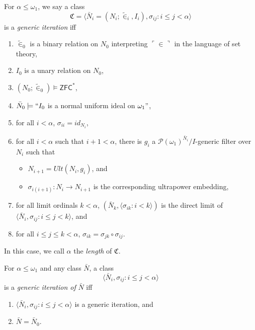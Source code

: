 \documentclass[12pt]{article}
\numberwithin{equation}{section}
\begin{document}
\begin{defi}\label{def257}
For $\alpha \leq \omega_1$, we say a class $$\mathfrak{C} = \langle \bar{N}_i = (N_i; \tilde{\in}_i, I_i), \sigma_{ij} : i \leq j < \alpha \rangle$$ is a \emph{generic iteration} iff 
\begin{enumerate}[label=(\alph*)]
    \item $\tilde{\in}_0$ is a binary relation on $N_0$ interpreting $\ulcorner \in \urcorner$ in the language of set theory,
    \item $I_0$ is a unary relation on $N_0$,
    \item $(N_0; \tilde{\in}_0) \models \mathsf{ZFC}^*$,
    \item $\bar{N}_0 \models ``I_0$ is a normal uniform ideal on $\omega_1"$, 
    \item for all $i < \alpha$, $\sigma_{ii} = id_{N_i}$,
    \item for all $i < \alpha$ such that $i + 1 < \alpha$, there is $g_{i}$ a $\mathcal{P}(\omega_1)^{\bar{N}_{i}} / I$-generic filter over $N_{i}$ such that 
    \begin{itemize}[label=$\circ$]
        \item $N_{i + 1} = Ult(N_{i}, g_{i})$, and
        \item $\sigma_{i(i + 1)} : N_{i} \longrightarrow N_{i + 1}$ is the corresponding ultrapower embedding,
    \end{itemize}
    \item for all limit ordinals $k < \alpha$, $(\bar{N}_{k}, \langle \sigma_{ik} : i < k \rangle)$ is the direct limit of $\langle \bar{N}_i, \sigma_{ij} : i \leq j < k \rangle$, and
    \item for all $i \leq j \leq k < \alpha$, $\sigma_{ik} = \sigma_{jk} \circ \sigma_{ij}$.
\end{enumerate}
In this case, we call $\alpha$ the \emph{length} of $\mathfrak{C}$.
\end{defi}

\begin{defi}
For $\alpha \leq \omega_1$ and any class $\bar{N}$, a class $$\langle \bar{N}_i, \sigma_{ij} : i \leq j < \alpha \rangle$$ is a \emph{generic iteration of} $\bar{N}$ iff 
\begin{enumerate}[label=(\alph*)]
    \item $\langle \bar{N}_i, \sigma_{ij} : i \leq j < \alpha \rangle$ is a generic iteration, and
    \item $\bar{N} = \bar{N}_0$.
\end{enumerate}
\end{defi}
\end{document}
